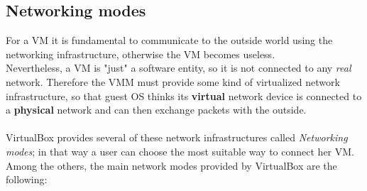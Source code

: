 \documentclass[a4paper, 12pt, titlepage]{report}
\begin{document}
\subsection{Networking modes} \label{subsec:net_modes}
For a VM it is fundamental to communicate to the outside world using the networking infrastructure, otherwise the VM becomes useless.
\\
Nevertheless, a VM is "just" a software entity, so it is not connected to any \textit{real} network. Therefore the VMM must provide some kind of virtualized network infrastructure, so that guest OS thinks its \textbf{virtual} network device is connected to a \textbf{physical} network and can then exchange packets with the outside.
\\
\\
VirtualBox provides several of these network infrastructures called \textit{Networking modes}; in that way a user can choose the most suitable way to connect her VM. Among the others, the main network modes provided by VirtualBox are the following:
\end{document}
